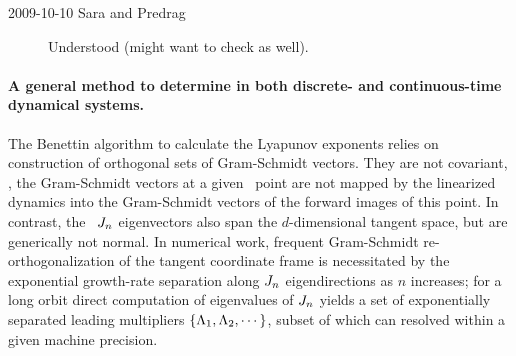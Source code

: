 \begin{description}
\item[2009-10-10 Sara and Predrag] Understood
 (might want to
check  as well).
\end{description}

\paragraph{
A general method to
determine {\cLvs} in both discrete- and
continuous-time dynamical systems.
            }

The Benettin \etal{} algorithm to calculate the
Lyapunov exponents relies on construction of orthogonal sets of
Gram-Schmidt vectors. They  are not covariant, \ie, the
Gram-Schmidt vectors at a given \statesp\ point are not mapped
by the linearized dynamics into the Gram-Schmidt vectors of the
forward images of this point. In contrast, the \jacobianM\
$J_n$ eigenvectors \jEigvec[i] also span the
$d$-dimensional tangent space, but are generically not normal.
In numerical work, frequent Gram-Schmidt re-orthogonalization
of the tangent coordinate frame is necessitated by the
exponential growth-rate separation along $J_n$
eigendirections as $n$ increases; for a long orbit direct
computation of eigenvalues of $J_n$ yields a set of
exponentially separated leading multipliers
$\{\Lambda_1,\Lambda_2,\cdots\}$, subset of which can
resolved within a given machine precision.

